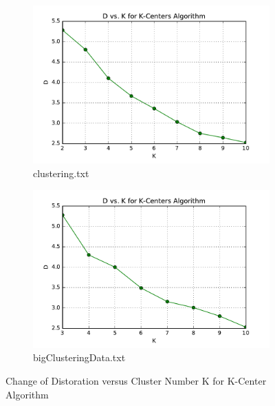 \begin{description}
\begin{description}
\begin{figure}[H]
\centering
\centering
        \begin{subfigure}[b]{0.49\textwidth}
            \centering
            \includegraphics[width=\textwidth]{./figures/loss_clustering_kCenter.pdf}
            \caption{clustering.txt}\label{fig:4a}
        \end{subfigure}
        \hfill
        \begin{subfigure}[b]{0.49\textwidth}  
            \centering 
            \includegraphics[width=\textwidth]{./figures/loss_bigClustering_kCenter.pdf}
            \caption{bigClusteringData.txt}\label{fig:4b}
        \end{subfigure}
\caption{Change of Distoration versus Cluster Number K for K-Center Algorithm}
\label{fig:k-centers-loss} 
\end{figure}


\end{description}
\end{description}
